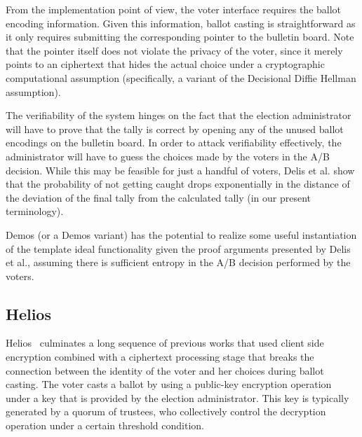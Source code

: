 From the implementation point of view, the voter interface requires
the ballot encoding information. Given this information, ballot
casting is straightforward as it only requires submitting the
corresponding pointer to the bulletin board. Note that the pointer
itself does not violate the privacy of the voter, since it merely
points to an ciphertext that hides the actual choice under a
cryptographic computational assumption (specifically, a variant of the
Decisional Diffie Hellman assumption).

The verifiability of the system hinges on the fact that the election
administrator will have to prove that the tally is correct by opening
any of the unused ballot encodings on the bulletin board. In order to
attack verifiability effectively, the administrator will have to guess
the choices made by the voters in the A/B decision. While this may be
feasible for just a handful of voters, Delis et al. show that the
probability of not getting caught drops exponentially in the distance
of the deviation of the final tally from the calculated tally (in our
present terminology).

Demos (or a Demos variant) has the potential to realize some useful
instantiation of the template ideal functionality given the proof
arguments presented by Delis et al., assuming there is sufficient
entropy in the A/B decision performed by the voters.

\subsection{Helios}

Helios~\cite{adida2008} culminates a long sequence of previous works
that used client side encryption combined with a ciphertext processing
stage that breaks the connection between the identity of the voter and
her choices during ballot casting. The voter casts a ballot by using a
public-key encryption operation under a key that is provided by the
election administrator. This key is typically generated by a quorum of
trustees, who collectively control the decryption operation under a
certain threshold condition.

